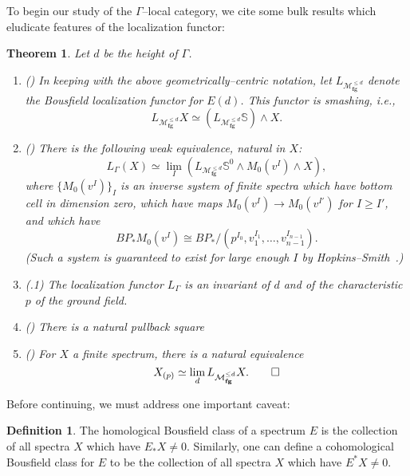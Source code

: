 \documentclass{amsart}
\renewcommand{\S}{\mathbb S}
\newcommand{\<}{\langle}
\renewcommand{\>}{\rangle}
\newcommand{\sm}{\wedge}
\newcommand{\moduli}[1]{\mathcal{M}_{\mathbf{#1}}}
\theoremstyle{plain}
\newtheorem*{theorem}{Theorem}
\theoremstyle{definition}
\newtheorem*{definition}{Definition}
\theoremstyle{remark}
\begin{document}
To begin our study of the $\Gamma$--local category, we cite some bulk results which eludicate features of the localization functor:
\begin{theorem}\label{HoveyMooreSpectrumLemma}
Let $d$ be the height of $\Gamma$.
\begin{enumerate}
\item (\cite[Theorem 7.5.6]{RavenelOrangeBook}) In keeping with the above geometrically--centric notation, let $L_{\moduli{fg}^{\le d}}$ denote the Bousfield localization functor for $E(d)$.  This functor is smashing, i.e., \[L_{\moduli{fg}^{\le d}} X \simeq \left(L_{\moduli{fg}^{\le d}} \S\right) \sm X.\]
\item (\cite[Lemma 2.3]{HoveyCSC}) There is the following weak equivalence, natural in $X$: \[L_\Gamma(X) \simeq \lim_I \left(L_{\moduli{fg}^{\le d}} \S^0 \sm M_0(v^I) \sm X\right),\] where $\{M_0(v^I)\}_I$ is an inverse system of finite spectra which have bottom cell in dimension zero, which have maps $M_0(v^I) \to M_0(v^{I'})$ for $I \ge I'$, and which have \[BP_* M_0(v^I) \cong BP_* / (p^{I_0}, v_1^{I_1}, \ldots, v_{n-1}^{I_{n-1}}).\]  (Such a system is guaranteed to exist for large enough $I$ by Hopkins--Smith~\cite[Proposition 5.14]{HopkinsSmith}.)
\item (.1) The localization functor $L_\Gamma$ is an invariant of $d$ and of the characteristic $p$ of the ground field.
\item (\cite[Theorem 2.1.d, Lemma 2.3]{RavenelLocalizationWRTPeriodic}) There is a natural pullback square
\begin{center}
\end{center}
\item (\cite[Theorem 7.5.7]{RavenelOrangeBook}) For $X$ a finite spectrum, there is a natural equivalence \[X_{(p)} \simeq \lim_d L_{\moduli{fg}^{\le d}} X. \qed \]
\end{enumerate}
\end{theorem}

Before continuing, we must address one important caveat:

\begin{definition}
The homological Bousfield class of a spectrum $E$ is the collection of all spectra $X$ which have $E_* X \ne 0$.  Similarly, one can define a cohomological Bousfield class for $E$ to be the collection of all spectra $X$ which have $E^* X \ne 0$.
\end{definition}
\end{document}

